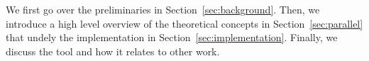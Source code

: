 
We first go over the preliminaries in Section~\ref{sec:background}. Then, we introduce a high level overview of the theoretical concepts in Section~\ref{sec:parallel} that undely the implementation in Section~\ref{sec:implementation}. Finally, we discuss the tool and how it relates to other work.
